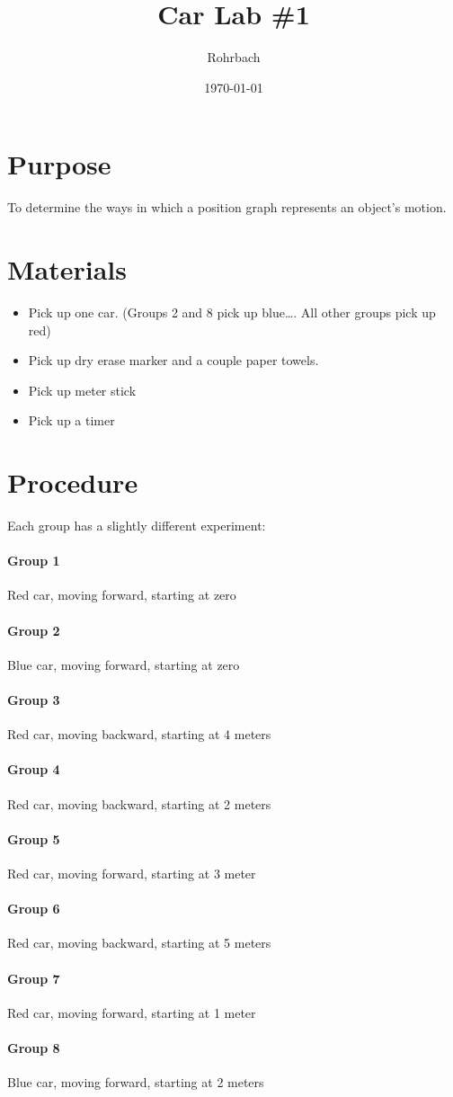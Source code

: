 \documentclass[10pt]{exam}
\title{Car Lab \#1}
\author{Rohrbach}
\date{\today}
\begin{document}
\maketitle

\section*{Purpose}

To determine the ways in which a position graph represents an object's motion.

\section*{Materials}

\begin{itemize}
  \item Pick up one car.  (Groups 2 and 8 pick up blue…. All other groups pick up red)
  \item Pick up dry erase marker and a couple paper towels.
  \item Pick up meter stick 
  \item	Pick up a timer
\end{itemize}

\section*{Procedure}

Each group has a slightly different experiment:

  \paragraph{Group 1}	Red car, moving forward, starting at zero
  \paragraph{Group 2}	Blue car, moving forward, starting at zero
  \paragraph{Group 3}	Red car, moving backward, starting at 4 meters
  \paragraph{Group 4}	Red car, moving backward, starting at 2 meters
  \paragraph{Group 5}	Red car, moving forward, starting at 3 meter
  \paragraph{Group 6}	Red car, moving backward, starting at 5 meters
  \paragraph{Group 7}	Red car, moving forward, starting at 1 meter
  \paragraph{Group 8}	Blue car, moving forward, starting at 2 meters
  
\end{document}

